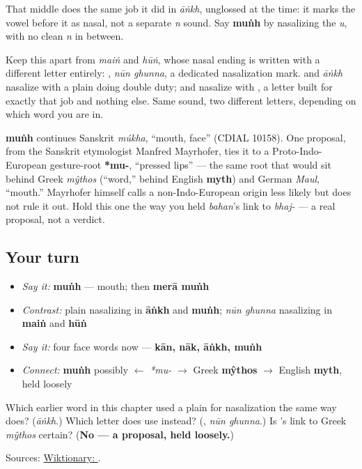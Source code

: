 That middle \textbf{} does the same job it did in \emph{āṅkh}, unglossed at the time: it marks the vowel before it as nasal, not a separate \emph{n} sound. Say \textbf{muṅh} by nasalizing the \emph{u}, with no clean \emph{n} in between.

Keep this apart from \textbf{} \emph{maiṅ} and \textbf{} \emph{hūṅ}, whose nasal ending is written with a different letter entirely: \textbf{}, \emph{nūn ghunna}, a dedicated nasalization mark. \textbf{} and \emph{āṅkh} nasalize with a plain \textbf{} doing double duty; \textbf{} and \textbf{} nasalize with \textbf{}, a letter built for exactly that job and nothing else. Same sound, two different letters, depending on which word you are in.

\begin{cousinweb}
\textbf{muṅh} continues Sanskrit \emph{múkha}, \textquotedblleft{}mouth, face\textquotedblright{} (CDIAL 10158). One proposal, from the Sanskrit etymologist Manfred Mayrhofer, ties it to a Proto-Indo-European gesture-root \textbf{*mu-}, \textquotedblleft{}pressed lips\textquotedblright{} — the same root that would sit behind Greek \emph{mŷthos} (\textquotedblleft{}word,\textquotedblright{} behind English \textbf{myth}) and German \emph{Maul}, \textquotedblleft{}mouth.\textquotedblright{} Mayrhofer himself calls a non-Indo-European origin less likely but does not rule it out. Hold this one the way you held \emph{bahan}'s link to \emph{bhaj-} — a real proposal, not a verdict.
\end{cousinweb}

\subsection*{Your turn}
\begin{itemize}
\raggedright
  \item \emph{Say it:} \textbf{muṅh} — mouth; then \textbf{merā muṅh}
  \item \emph{Contrast:} plain \textbf{} nasalizing in \textbf{āṅkh} and \textbf{muṅh}; \textbf{} \emph{nūn ghunna} nasalizing in \textbf{maiṅ} and \textbf{hūṅ}
  \item \emph{Say it:} four face words now — \textbf{kān, nāk, āṅkh, muṅh}
  \item \emph{Connect:} \textbf{muṅh} possibly $\leftarrow$ \emph{*mu-} $\to$ Greek \textbf{mŷthos} $\to$ English \textbf{myth}, held loosely
\end{itemize}

\begin{tcolorbox}[breakable,colback=teal!4,colframe=teal!35!black,title={Before you move on}]
Which earlier word in this chapter used a plain \textbf{} for nasalization the same way \textbf{} does? (\emph{āṅkh}.) Which letter does \textbf{} use instead? (\textbf{}, \emph{nūn ghunna}.) Is \textbf{}'s link to Greek \emph{mŷthos} certain? (\textbf{No — a proposal, held loosely.})

Sources: \href{https://en.wiktionary.org/wiki/\%D9\%85\%D9\%86\%DB\%81}{Wiktionary: }.
\end{tcolorbox}
